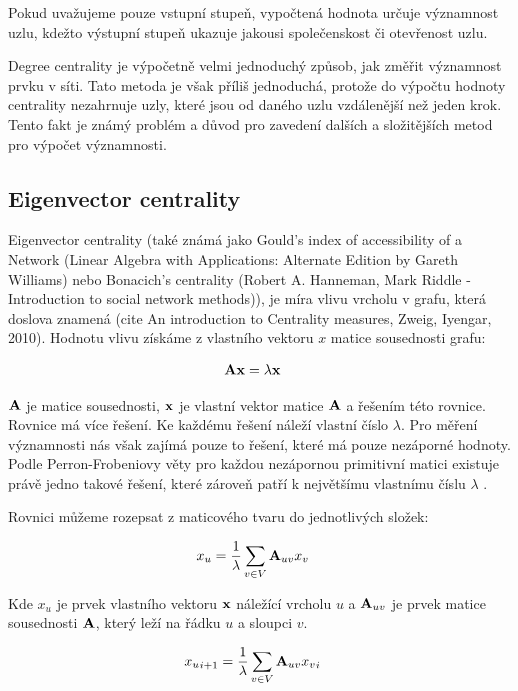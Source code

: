 \documentclass{bakalarka}
\begin{document}
Pokud uvažujeme pouze vstupní stupeň, vypočtená hodnota určuje významnost uzlu,
kdežto výstupní stupeň ukazuje jakousi společenskost či otevřenost uzlu. 

Degree centrality je výpočetně velmi jednoduchý způsob, jak změřit významnost
prvku v síti. Tato metoda je však příliš jednoduchá, protože do výpočtu hodnoty
centrality nezahrnuje uzly, které jsou od daného uzlu vzdálenější než jeden
krok. Tento fakt je známý problém a důvod pro zavedení dalších a složitějších
metod pro výpočet významnosti.



\subsection{Eigenvector centrality}
Eigenvector centrality (také známá jako Gould's index of accessibility of a
Network (Linear Algebra with Applications: Alternate Edition by Gareth
Williams) nebo Bonacich's centrality (Robert A. Hanneman, Mark Riddle -
Introduction to social network methods)), je míra vlivu vrcholu v grafu, která
doslova znamená  (cite An introduction to
Centrality measures, Zweig, Iyengar, 2010). Hodnotu vlivu získáme z vlastního
vektoru $x$ matice sousednosti grafu:

\begin{align}
{\bf Ax} &= \lambda {\bf x}
\end{align}

${\bf A}$ je matice sousednosti, ${\bf x}$ je vlastní vektor matice ${\bf A}$ a
řešením této rovnice. Rovnice má více řešení. Ke každému řešení náleží vlastní
číslo $\lambda$. Pro měření významnosti nás však zajímá pouze to řešení, které
má pouze nezáporné hodnoty. Podle Perron-Frobeniovy věty pro každou nezápornou
primitivní matici existuje právě jedno takové řešení, které zároveň patří k
největšímu vlastnímu číslu $\lambda$ \cite{langvillemeyer}.

Rovnici můžeme rozepsat z maticového tvaru do jednotlivých složek:

\begin{align} 
x_u &=  \frac{1}{\lambda} \displaystyle\sum_{v \in V} {\bf A}_{uv} x_v 
\end{align} 

Kde $x_u$ je prvek vlastního vektoru ${\bf x}$
náležící vrcholu $u$ a ${\bf A}_{uv}$ je prvek matice sousednosti ${\bf A}$,
který leží na řádku $u$ a sloupci $v$.

\begin{align} 
{x_u}_{i + 1} &=  \frac{1}{\lambda} \displaystyle\sum_{v \in V} {\bf A}_{uv}
{x_v}_{i}
\end{align} 
\end{document}
